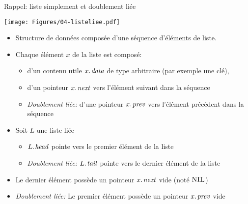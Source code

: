 \begin{frame}{Rappel: liste simplement et doublement liée}

\centerline{\texttt{[image: Figures/04-listeliee.pdf]}}

\bigskip

\begin{itemize}
\item Structure de données composée d'une séquence d'éléments de liste.
\item Chaque élément $x$ de la liste est composé:
\begin{itemize}
\item d'un contenu utile $\attrib{x}{data}$ de type arbitraire (par exemple une clé),
\item d'un pointeur $\attrib{x}{next}$ vers l'élément suivant dans la séquence
\item \emph{Doublement liée: }d'une pointeur $\attrib{x}{prev}$ vers l'élément précédent dans la séquence
\end{itemize}
\item Soit $L$ une liste liée
\begin{itemize}
\item $\attrib{L}{head}$ pointe vers le premier élément de la liste
\item \emph{Doublement liée:} $\attrib{L}{tail}$ pointe vers le dernier élément de la liste
\end{itemize}
\item Le dernier élément possède un pointeur $\attrib{x}{next}$ vide (noté $\textnormal{\scshape NIL}$)
\item \emph{Doublement liée:} Le premier élément possède un pointeur $\attrib{x}{prev}$ vide
\end{itemize}
\end{frame}



